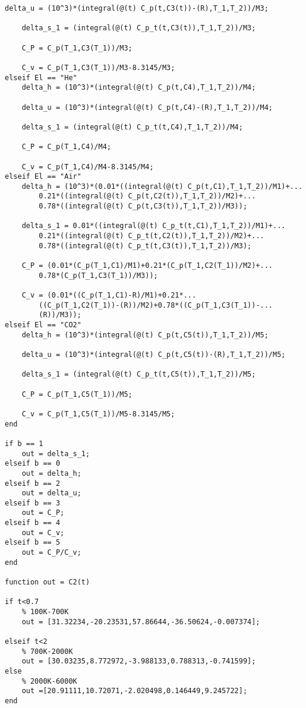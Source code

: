 \documentclass{article}
\begin{document}
\begin{lstlisting}[style=Matlab-editor]
    delta_u = (10^3)*(integral(@(t) C_p(t,C3(t))-(R),T_1,T_2))/M3;
    
    delta_s_1 = (integral(@(t) C_p_t(t,C3(t)),T_1,T_2))/M3;
    
    C_P = C_p(T_1,C3(T_1))/M3;
    
    C_v = C_p(T_1,C3(T_1))/M3-8.3145/M3;
elseif El == "He"
    delta_h = (10^3)*(integral(@(t) C_p(t,C4),T_1,T_2))/M4;
    
    delta_u = (10^3)*(integral(@(t) C_p(t,C4)-(R),T_1,T_2))/M4;

    delta_s_1 = (integral(@(t) C_p_t(t,C4),T_1,T_2))/M4;
    
    C_P = C_p(T_1,C4)/M4;
    
    C_v = C_p(T_1,C4)/M4-8.3145/M4;
elseif El == "Air"
    delta_h = (10^3)*(0.01*((integral(@(t) C_p(t,C1),T_1,T_2))/M1)+...
        0.21*((integral(@(t) C_p(t,C2(t)),T_1,T_2))/M2)+...
        0.78*((integral(@(t) C_p(t,C3(t)),T_1,T_2))/M3));

    delta_s_1 = 0.01*((integral(@(t) C_p_t(t,C1),T_1,T_2))/M1)+...
        0.21*((integral(@(t) C_p_t(t,C2(t)),T_1,T_2))/M2)+...
        0.78*((integral(@(t) C_p_t(t,C3(t)),T_1,T_2))/M3);
    
    C_P = (0.01*(C_p(T_1,C1)/M1)+0.21*(C_p(T_1,C2(T_1))/M2)+...
        0.78*(C_p(T_1,C3(T_1))/M3));
    
    C_v = (0.01*((C_p(T_1,C1)-R)/M1)+0.21*...
        ((C_p(T_1,C2(T_1))-(R))/M2)+0.78*((C_p(T_1,C3(T_1))-...
        (R))/M3));
elseif El == "CO2"
    delta_h = (10^3)*(integral(@(t) C_p(t,C5(t)),T_1,T_2))/M5;

    delta_u = (10^3)*(integral(@(t) C_p(t,C5(t))-(R),T_1,T_2))/M5;
    
    delta_s_1 = (integral(@(t) C_p_t(t,C5(t)),T_1,T_2))/M5;
    
    C_P = C_p(T_1,C5(T_1))/M5;
    
    C_v = C_p(T_1,C5(T_1))/M5-8.3145/M5;
end

if b == 1
    out = delta_s_1;
elseif b == 0
    out = delta_h;
elseif b == 2
    out = delta_u;
elseif b == 3
    out = C_P;
elseif b == 4
    out = C_v;
elseif b == 5
    out = C_P/C_v; 
end

function out = C2(t)

if t<0.7
    % 100K-700K
    out = [31.32234,-20.23531,57.86644,-36.50624,-0.007374];
    
elseif t<2
    % 700K-2000K
    out = [30.03235,8.772972,-3.988133,0.788313,-0.741599];
else
    % 2000K-6000K
    out =[20.91111,10.72071,-2.020498,0.146449,9.245722];
end


\end{lstlisting}
\end{document}
